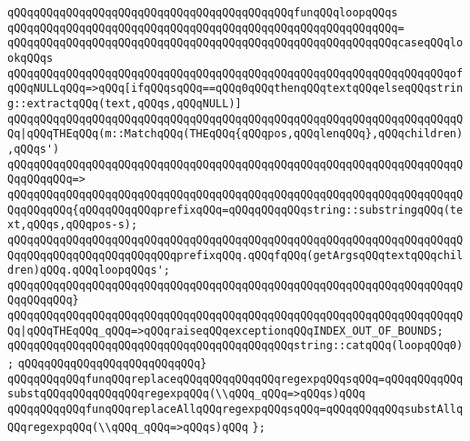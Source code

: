 \verb|qQQqqQQqqQQqqQQqqQQqqQQqqQQqqQQqqQQqqQQqqQQqfunqQQqloopqQQqs|\newline
\verb|qQQqqQQqqQQqqQQqqQQqqQQqqQQqqQQqqQQqqQQqqQQqqQQqqQQqqQQqqQQq=|\newline
\verb|qQQqqQQqqQQqqQQqqQQqqQQqqQQqqQQqqQQqqQQqqQQqqQQqqQQqqQQqqQQqcaseqQQqlookqQQqs|\newline
\newline
\verb|qQQqqQQqqQQqqQQqqQQqqQQqqQQqqQQqqQQqqQQqqQQqqQQqqQQqqQQqqQQqqQQqqQQqofqQQqNULLqQQq=>qQQq[ifqQQqsqQQq==qQQq0qQQqthenqQQqtextqQQqelseqQQqstring::extractqQQq(text,qQQqs,qQQqNULL)]|\newline
\newline
\verb|qQQqqQQqqQQqqQQqqQQqqQQqqQQqqQQqqQQqqQQqqQQqqQQqqQQqqQQqqQQqqQQqqQQqqQQq|\verb#|qQQqTHEqQQq(m::MatchqQQq(THEqQQq{qQQqpos,qQQqlenqQQq},qQQqchildren),qQQqs')#\newline
\verb|qQQqqQQqqQQqqQQqqQQqqQQqqQQqqQQqqQQqqQQqqQQqqQQqqQQqqQQqqQQqqQQqqQQqqQQqqQQqqQQq=>|\newline
\verb|qQQqqQQqqQQqqQQqqQQqqQQqqQQqqQQqqQQqqQQqqQQqqQQqqQQqqQQqqQQqqQQqqQQqqQQqqQQqqQQq{qQQqqQQqqQQqprefixqQQq=qQQqqQQqqQQqstring::substringqQQq(text,qQQqs,qQQqpos-s);|\newline
\newline
\verb|qQQqqQQqqQQqqQQqqQQqqQQqqQQqqQQqqQQqqQQqqQQqqQQqqQQqqQQqqQQqqQQqqQQqqQQqqQQqqQQqqQQqqQQqqQQqqQQqprefixqQQq.qQQqfqQQq(getArgsqQQqtextqQQqchildren)qQQq.qQQqloopqQQqs';|\newline
\verb|qQQqqQQqqQQqqQQqqQQqqQQqqQQqqQQqqQQqqQQqqQQqqQQqqQQqqQQqqQQqqQQqqQQqqQQqqQQqqQQq}|\newline
\newline
\verb|qQQqqQQqqQQqqQQqqQQqqQQqqQQqqQQqqQQqqQQqqQQqqQQqqQQqqQQqqQQqqQQqqQQqqQQq|\verb#|qQQqTHEqQQq_qQQq=>qQQqraiseqQQqexceptionqQQqINDEX_OUT_OF_BOUNDS;#\newline
\newline
\verb|qQQqqQQqqQQqqQQqqQQqqQQqqQQqqQQqqQQqqQQqqQQqstring::catqQQq(loopqQQq0);|\newline
\verb|qQQqqQQqqQQqqQQqqQQqqQQqqQQq}|\newline
\newline
\verb|qQQqqQQqqQQqfunqQQqreplaceqQQqqQQqqQQqqQQqregexpqQQqsqQQq=qQQqqQQqqQQqsubstqQQqqQQqqQQqqQQqregexpqQQq(\\qQQq_qQQq=>qQQqs)qQQq|\newline
\verb|qQQqqQQqqQQqfunqQQqreplaceAllqQQqregexpqQQqsqQQq=qQQqqQQqqQQqsubstAllqQQqregexpqQQq(\\qQQq_qQQq=>qQQqs)qQQq|\newline
\newline
\verb|};|\newline
\newline

